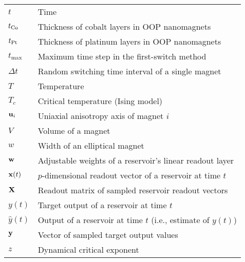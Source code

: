 \begin{longtable}[l]{p{60pt} p{350pt}}
	$t$ & Time \\
	$t_{\ce{Co}}$ & Thickness of cobalt layers in OOP nanomagnets \\
	$t_{\ce{Pt}}$ & Thickness of platinum layers in OOP nanomagnets \\
	$t_\mathrm{max}$ & Maximum time step in the first-switch method \\
	$\Delta t$ & Random switching time interval of a single magnet \\
	$T$ & Temperature \\
	$T_c$ & Critical temperature (Ising model) \\[\whiteline]

	$\boldsymbol{\mathbf{u}}_i$ & Uniaxial anisotropy axis of magnet $i$ \\[\whiteline]

	$V$ & Volume of a magnet \\[\whiteline]

	$w$ & Width of an elliptical magnet \\
	$\boldsymbol{\mathbf{w}}$ & Adjustable weights of a reservoir's linear readout layer \\[\whiteline]
	
	$\boldsymbol{\mathbf{x}}(t)$ & $p$-dimensional readout vector of a reservoir at time $t$ \\
	$\boldsymbol{\mathbf{X}}$ & Readout matrix of sampled reservoir readout vectors \\[\whiteline]
	
	$y(t)$ & Target output of a reservoir at time $t$ \\
	$\hat{y}(t)$ & Output of a reservoir at time $t$ (i.e., estimate of $y(t)$) \\
	$\boldsymbol{\mathbf{y}}$ & Vector of sampled target output values \\[\whiteline]
	
	$z$ & Dynamical critical exponent \\[\whiteline]
\end{longtable}

